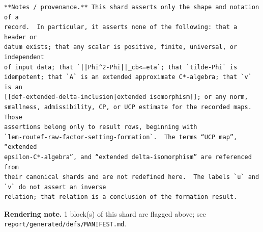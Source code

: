 \begin{defnote}
\begin{verbatim}
**Notes / provenance.** This shard asserts only the shape and notation of a
record.  In particular, it asserts none of the following: that a header or
datum exists; that any scalar is positive, finite, universal, or independent
of input data; that `||Phi^2-Phi||_cb<=eta`; that `tilde-Phi` is
idempotent; that `A` is an extended approximate C*-algebra; that `v` is an
[[def-extended-delta-inclusion|extended isomorphism]]; or any norm,
smallness, admissibility, CP, or UCP estimate for the recorded maps.  Those
assertions belong only to result rows, beginning with
`lem-routef-raw-factor-setting-formation`.  The terms “UCP map”, “extended
epsilon-C*-algebra”, and “extended delta-isomorphism” are referenced from
their canonical shards and are not redefined here.  The labels `u` and `v` do not assert an inverse
relation; that relation is a conclusion of the formation result.
\end{verbatim}
\par
\textbf{Rendering note.} 1 block(s) of this shard are flagged above; see \texttt{report/generated/defs/MANIFEST.md}.
\end{defnote}
